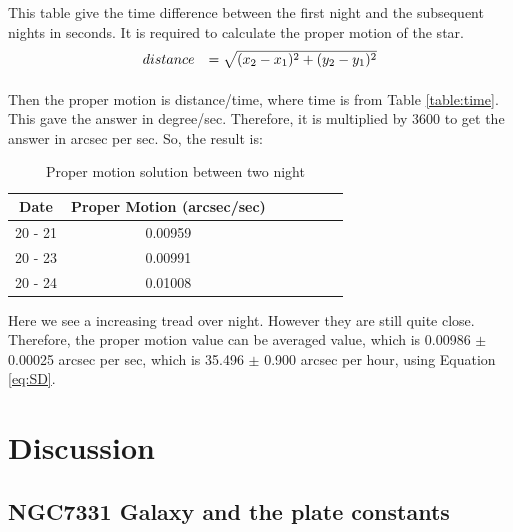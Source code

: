 \documentclass[a4paper,12pt]{article}
\begin{document}
This table give the time difference between the first night and the subsequent nights in seconds. It is required to calculate the proper motion of the star. 
\begin{equation}
\label{eq:proper}
\begin{array}{rcl}
   \vspace{0.3cm}
   distance &= \sqrt{(x_2-x_1)^2 + (y_2-y_1)^2}\\
\end{array}
\end{equation}
Then the proper motion is distance/time, where time is from Table \ref{table:time}. This gave the answer in degree/sec. Therefore, it is multiplied by 3600 to get the answer in arcsec per sec. So, the result is:
\begin{table}[H]
\centering %
\caption{Proper motion solution between two night}
\footnotesize

\begin{tabular}{ccccccc}%
\hline
\hline
Date & Proper Motion (arcsec/sec) \\
\hline
\hline
20 - 21  & 0.00959  \\
20 - 23  &  0.00991 \\
20 - 24  &  0.01008  \\
\hline
\hline

\end{tabular}
\label{table:proper} %
\end{table}

Here we see a increasing tread over night. However they are still quite close. Therefore, the proper motion value can be averaged value, which is 0.00986 $\pm$ 0.00025 arcsec per sec, which is 35.496 $\pm$ 0.900 arcsec per hour, using Equation \ref{eq:SD}.

\section{Discussion}
\label{sec:discuss}
\subsection{NGC7331 Galaxy and the plate constants} 
\label{sec:galaxy}
\end{document}

